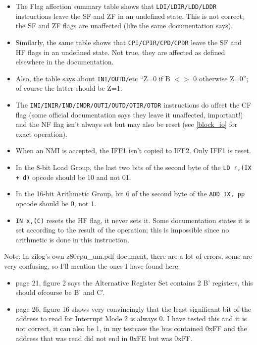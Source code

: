 \documentclass[twoside,openright,a4paper]{book}
\begin{document}
\begin{itemize}

	\item
	The Flag affection summary table shows that {\tt LDI/LDIR/LDD/LDDR} instructions leave the SF and ZF in an undefined state. This is not correct; the SF and ZF flags are unaffected (like the same documentation says).

	\item
	Similarly, the same table shows that {\tt CPI/CPIR/CPD/CPDR} leave the SF and HF flags in an undefined state. Not true, they are affected as defined elsewhere in the documentation.

	\item
	Also, the table says about {\tt INI/OUTD/}etc ``Z=0 if B $<>$ 0 otherwise Z=0''; of course the latter should be Z=1.

	\item
	The {\tt INI/INIR/IND/INDR/OUTI/OUTD/OTIR/OTDR} instructions do affect the CF flag (some official documentation says they leave it unaffected, important!) and the NF flag isn't always set but may also be reset (see \ref{block_io} for exact operation).

	\item
	When an NMI is accepted, the IFF1 isn't copied to IFF2. Only IFF1 is reset.

	\item
	In the 8-bit Load Group, the last two bits of the second byte of the {\tt LD r,(IX + d)} opcode should be 10 and not 01.

	\item
	In the 16-bit Arithmetic Group, bit 6 of the second byte of the {\tt ADD IX, pp} opcode should be 0, not 1.

	\item
	{\tt IN x,(C)} resets the HF flag, it never sets it. Some documentation states it is set according to the result of the operation; this is impossible since no arithmetic is done in this instruction.

\end{itemize}

Note: In zilog's own z80cpu\_um.pdf document, there are a lot of errors, some are very confusing, so I'll mention the ones I have found here:

\begin{itemize}

	\item
	page 21, figure 2 says the Alternative Register Set contains 2 B' registers, this should ofcourse be B' and C'.  

	\item
	page 26, figure 16 shows very convincingly that the least significant bit of the address to read for Interrupt Mode 2 is always 0. I have tested this and it is not correct, it can also be 1, in my testcase the bus contained 0xFF and the address that was read did not end in 0xFE but was 0xFF.
  
\end{itemize}
\end{document}
